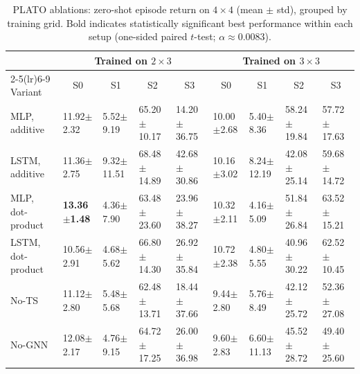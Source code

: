 \begin{table}[h]
\centering
\small
\setlength{\tabcolsep}{1.4pt}
\renewcommand{\arraystretch}{1.02}
\begin{tabular}{@{\hspace{2pt}}l|l|l|l|l||l|l|l|l@{\hspace{2pt}}}
\toprule
& \multicolumn{4}{c||}{Trained on $2\times 3$} & \multicolumn{4}{c}{Trained on $3\times 3$} \\
\cmidrule(lr){2-5}\cmidrule(lr){6-9}
Variant & \multicolumn{1}{c|}{S0} & \multicolumn{1}{c|}{S1} & \multicolumn{1}{c|}{S2} & \multicolumn{1}{c||}{S3}
        & \multicolumn{1}{c|}{S0} & \multicolumn{1}{c|}{S1} & \multicolumn{1}{c|}{S2} & \multicolumn{1}{c}{S3} \\
\midrule
MLP, additive      & 11.92$\pm$2.32 & 5.52$\pm$9.19   & 65.20$\pm$10.17 & 14.20$\pm$36.75
                  & 10.00$\pm$2.68 & 5.40$\pm$8.36   & 58.24$\pm$19.84 & 57.72$\pm$17.63 \\
LSTM, additive     & 11.36$\pm$2.75 & 9.32$\pm$11.51  & 68.48$\pm$14.89 & 42.68$\pm$30.86
                  & 10.16$\pm$3.02 & 8.24$\pm$12.19  & 42.08$\pm$25.14 & 59.68$\pm$14.72 \\
MLP, dot-product   & \textbf{13.36$\pm$1.48} & 4.36$\pm$7.90 & 63.48$\pm$23.60 & 23.96$\pm$38.27
                  & 10.32$\pm$2.11 & 4.16$\pm$5.09   & 51.84$\pm$26.84 & 63.52$\pm$15.21 \\
LSTM, dot-product  & 10.56$\pm$2.91 & 4.68$\pm$5.62   & 66.80$\pm$14.30 & 26.92$\pm$35.84
                  & 10.72$\pm$2.38 & 4.80$\pm$5.55   & 40.96$\pm$30.22 & 62.52$\pm$10.45 \\
No-TS              & 11.12$\pm$2.80 & 5.48$\pm$5.68   & 62.48$\pm$13.71 & 18.44$\pm$37.66
                  & 9.44$\pm$2.80  & 5.76$\pm$8.49   & 42.12$\pm$25.72 & 52.36$\pm$27.08 \\
No-GNN             & 12.08$\pm$2.17 & 4.76$\pm$9.15   & 64.72$\pm$17.25 & 26.00$\pm$36.98
                  & 9.60$\pm$2.83  & 6.60$\pm$11.13  & 45.52$\pm$28.72 & 49.40$\pm$25.60 \\
\bottomrule
\end{tabular}
\caption{PLATO ablations: zero-shot episode return on $4\times 4$ (mean $\pm$ std), grouped by training grid. Bold indicates statistically significant best performance within each setup (one-sided paired $t$-test; $\alpha\approx0.0083$).}
\label{tab:ablate_4x4_reward_train2x3_appendix}
\end{table}


